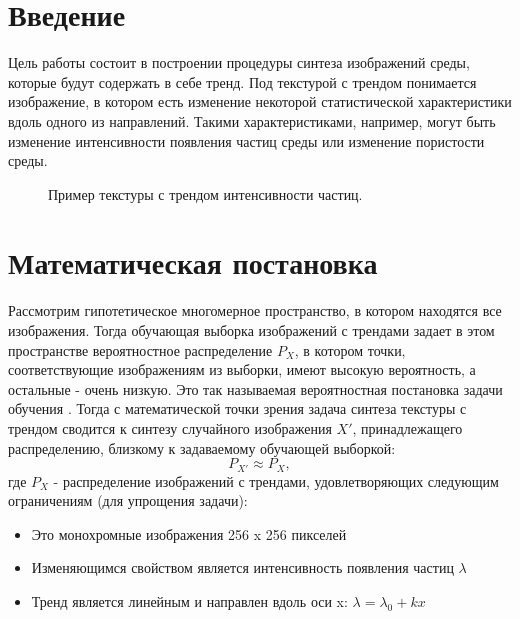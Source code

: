 \documentclass[a4paper]{article}
\begin{document}
	\section{Введение}
		Цель работы состоит в построении процедуры синтеза изображений среды, которые будут содержать в себе тренд. Под текстурой с трендом понимается изображение, в котором есть изменение некоторой статистической характеристики вдоль одного из направлений. Такими характеристиками, например, могут быть изменение интенсивности появления частиц среды или изменение пористости среды. \\
		\begin{figure}[h]
			\caption{Пример текстуры с трендом интенсивности частиц.}
		\end{figure}
	\section{Математическая постановка}
		Рассмотрим гипотетическое многомерное пространство, в котором находятся все изображения. Тогда обучающая выборка изображений с трендами задает в этом пространстве вероятностное распределение $P_X$, в котором точки, соответствующие изображениям из выборки, имеют высокую вероятность, а остальные - очень низкую. Это так называемая вероятностная постановка задачи обучения \cite{Voron-ML, GAN} . Тогда с математической точки зрения задача синтеза текстуры с трендом сводится к синтезу случайного изображения $X'$, принадлежащего распределению, близкому к задаваемому обучающей выборкой:
		$$ P_{X'} \approx P_X,$$
		где $P_X$ - распределение изображений с трендами, удовлетворяющих следующим ограничениям (для упрощения задачи):
		\begin{itemize}
			\item Это монохромные изображения 256 x 256 пикселей
			\item Изменяющимся свойством является интенсивность появления частиц $\lambda$
			\item Тренд является линейным и направлен вдоль оси x: 
			$ \lambda = \lambda_0 + kx $
		\end{itemize}
\end{document}
